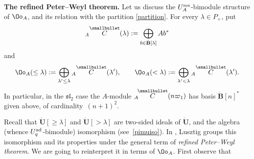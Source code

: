 {\bf The refined Peter--Weyl theorem.} Let us discuss the $U_A^{\rm res}$-bimodule structure of $\Oo_A$, and its relation with the partition \eqref{partition}. For every $\lambda\in P_+$, put
\begin{equation}\label{AClambda}
{}_A \overset{\raisebox{-1.5pt}{\scriptsize$\smallbullet$}}{C} (\lambda) := \bigoplus_{b\in \dot{\mathbf{B}}[\lambda]} Ab^*
\end{equation}
and
\[\Oo_A(\leq \lambda) := \bigoplus_{\lambda'\leq \lambda} {}_A \overset{\raisebox{-1.5pt}{\scriptsize$\smallbullet$}}{C} (\lambda') ,\qquad \Oo_A(< \lambda) := \bigoplus_{\lambda'< \lambda} {}_A \overset{\raisebox{-1.5pt}{\scriptsize$\smallbullet$}}{C} (\lambda').\]
In particular, in the ${\mathfrak{sl}_2}$ case the $A$-module ${}_A\! \overset{\raisebox{-1.5pt}{\scriptsize$\smallbullet$}}{C} (n\varpi_1)$ has basis $\dot{\mathbf{B}} [n]^*$ given above, of cardinality~${(n+1)^2}$.

Recall that $\dot{\mathbf{U}} [\geq \lambda]$ and $\dot{\mathbf{U}} [> \lambda]$ are two-sided ideals of $\dot{\mathbf{U}}$, and the algebra (whence $U_q^{\rm ad}$-bimodule) isomorphism  (see~\eqref{pimuiso}). In \cite[Section~29.3]{Lusztig}, Lusz\-tig groups this isomorphism and its properties under the general term of {\it refined Peter--Weyl theorem}. We are going to reinterpret it in terms of $\Oo_A$. First observe that

